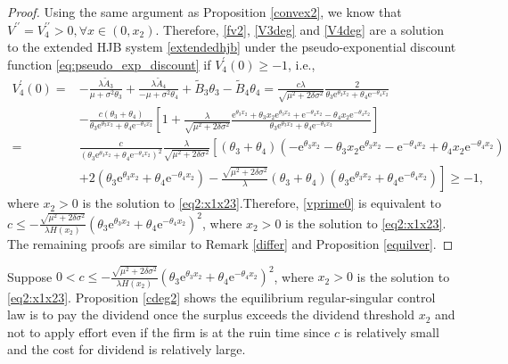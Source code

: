 \documentclass[11pt,reqno]{article}%
\numberwithin{equation}{section}
\begin{document}
\begin{proof}
Using the same argument as Proposition \ref{convex2}, we know that $V^{\prime\prime}=V_4^{\prime\prime}>0, \forall x\in(0,x_2)$. Therefore, \eqref{fv2}, \eqref{V3deg} and \eqref{V4deg} are a solution to the extended HJB system \eqref{extendedhjb} under the pseudo-exponential discount function \eqref{eq:pseudo_exp_discount} if $V_4^{\prime}(0)\ge -1$, i.e.,
\begin{equation}\label{vprime0}
\begin{aligned}
V_4^{\prime}(0)=&-\frac{\lambda \tilde{A}_3}{\mu+\sigma^2\theta_3}+\frac{\lambda \tilde{A}_4}{-\mu+\sigma^2\theta_4}+\tilde{B}_{3} \theta_{3}-\tilde{B}_{4} \theta_{4}=\frac{c\lambda }{\sqrt{\mu^2 + 2 \delta \sigma^2}}\frac{2}{\theta_{3} \mathrm{e}^{\theta_{3}x_2}+\theta_{4}\mathrm{e}^{-\theta_{4}x_2}}\\&-\frac{c(\theta_3+\theta_4)}{\theta_{3} \mathrm{e}^{\theta_{3}x_2}+\theta_{4}\mathrm{e}^{-\theta_{4}x_2}}\left[1+\frac{\lambda }{\sqrt{\mu^2 + 2 \delta \sigma^2}}\frac{\mathrm{e}^{\theta_{3}x_2}+\theta_{3}x_2\mathrm{e}^{\theta_{3}x_2}+\mathrm{e}^{-\theta_{4}x_2}-\theta_{4}x_2\mathrm{e}^{-\theta_{4}x_2}}{\theta_{3} \mathrm{e}^{\theta_{3}x_2}+\theta_{4}\mathrm{e}^{-\theta_{4}x_2}}\right]\\
=&\frac{c}{\left(\theta_{3} \mathrm{e}^{\theta_{3}x_2}+\theta_{4}\mathrm{e}^{-\theta_{4}x_2}\right)^2}\frac{\lambda }{\sqrt{\mu^2 + 2 \delta \sigma^2}}\left[(\theta_3+\theta_4)\left(-\mathrm{e}^{\theta_{3}x_2}-\theta_{3}x_2\mathrm{e}^{\theta_{3}x_2}-\mathrm{e}^{-\theta_{4}x_2}+\theta_{4}x_2\mathrm{e}^{-\theta_{4}x_2}\right)\right.\\&\left.+2\left(\theta_{3} \mathrm{e}^{\theta_{3}x_2}+\theta_{4}\mathrm{e}^{-\theta_{4}x_2}\right)-\frac{\sqrt{\mu^2 + 2 \delta \sigma^2}}{\lambda }(\theta_3+\theta_4)\left(\theta_{3} \mathrm{e}^{\theta_{3}x_2}+\theta_{4}\mathrm{e}^{-\theta_{4}x_2}\right)\right]\ge -1,\end{aligned}
\end{equation}
where $x_2>0$ is the solution to \eqref{eq2:x1x23}.Therefore, \eqref{vprime0} is equivalent to $c\le -\frac{\sqrt{\mu^2 + 2 \delta \sigma^2}}{\lambda H(x_2) }\left(\theta_{3} \mathrm{e}^{\theta_{3}x_2}+\theta_{4}\mathrm{e}^{-\theta_{4}x_2}\right)^2$, where $x_2>0$ is the solution to \eqref{eq2:x1x23}. The remaining proofs are similar to Remark \ref{differ} and Proposition \ref{equilver}.
\end{proof}

Suppose $0<c\le -\frac{\sqrt{\mu^2 + 2 \delta \sigma^2}}{\lambda H(x_2) }\left(\theta_{3} \mathrm{e}^{\theta_{3}x_2}+\theta_{4}\mathrm{e}^{-\theta_{4}x_2}\right)^2$, where $x_2>0$ is the solution to \eqref{eq2:x1x23}. Proposition \ref{cdeg2} shows  the equilibrium regular-singular control law is to pay the dividend once the surplus exceeds the dividend threshold $x_2$ and not to apply effort even if the firm is at the ruin time since $c$ is relatively small and the cost for dividend is relatively large.
\end{document}
